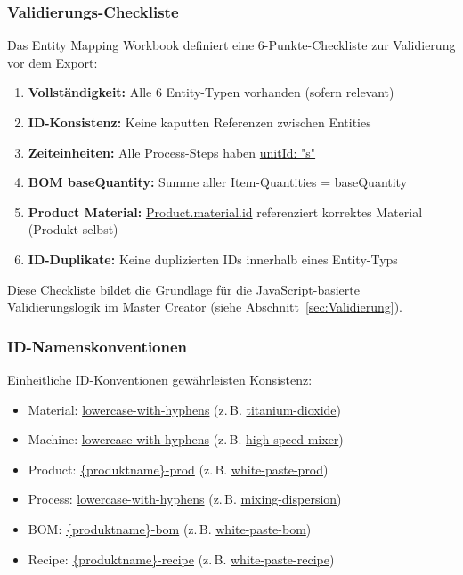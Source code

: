 \subsubsection{Validierungs-Checkliste}

Das Entity Mapping Workbook definiert eine 6-Punkte-Checkliste zur Validierung vor dem Export:

\begin{enumerate}
    \item \textbf{Vollständigkeit:} Alle 6 Entity-Typen vorhanden (sofern relevant)
    \item \textbf{ID-Konsistenz:} Keine kaputten Referenzen zwischen Entities
    \item \textbf{Zeiteinheiten:} Alle Process-Steps haben \url{unitId: "s"}
    \item \textbf{BOM baseQuantity:} Summe aller Item-Quantities = baseQuantity
    \item \textbf{Product Material:} \url{Product.material.id} referenziert korrektes Material (Produkt selbst)
    \item \textbf{ID-Duplikate:} Keine duplizierten IDs innerhalb eines Entity-Typs
\end{enumerate}

\noindent Diese Checkliste bildet die Grundlage für die JavaScript-basierte Validierungslogik im Master Creator (siehe Abschnitt~\ref{sec:Validierung}).

\subsubsection{ID-Namenskonventionen}

Einheitliche ID-Konventionen gewährleisten Konsistenz:

\begin{itemize}
    \item Material: \url{lowercase-with-hyphens} (z.\,B. \url{titanium-dioxide})
    \item Machine: \url{lowercase-with-hyphens} (z.\,B. \url{high-speed-mixer})
    \item Product: \url{\{produktname\}-prod} (z.\,B. \url{white-paste-prod})
    \item Process: \url{lowercase-with-hyphens} (z.\,B. \url{mixing-dispersion})
    \item BOM: \url{\{produktname\}-bom} (z.\,B. \url{white-paste-bom})
    \item Recipe: \url{\{produktname\}-recipe} (z.\,B. \url{white-paste-recipe})
\end{itemize}

